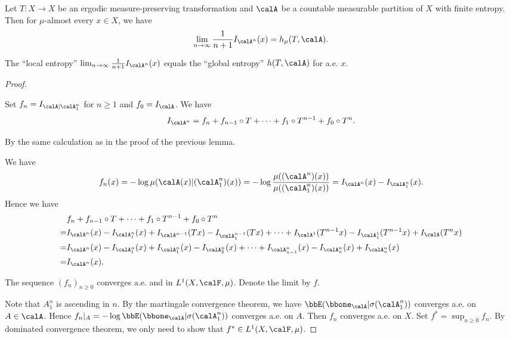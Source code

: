   \begin{theorem}
    Let $T: X \to X$ be an ergodic measure-preserving transformation and $\calA$ be a countable measurable partition of $X$ with finite entropy. 
    Then for $\mu$-almost every $x \in X$, we have
    \[
      \lim_{n \to \infty} \frac{1}{n+1} I_{\calA^n}(x) = h_\mu(T, \calA).
    \]
  \end{theorem}
  \begin{slogan}
    The ``local entropy'' $\lim_{n \to \infty} \frac{1}{n+1} I_{\calA^n}(x)$ equals the ``global entropy'' $h(T, \calA)$ for a.e. $x$.
  \end{slogan}
  \begin{proof}
    \hspace{1em}

    \begin{step}
      Set $f_n = I_{\calA | \calA^n_1}$ for $n \geq 1$ and $f_0 = I_{\calA}$.
      We have 
      \[ I_{\calA^n} = f_n + f_{n-1} \circ T + \cdots + f_1 \circ T^{n-1} + f_0 \circ T^n. \]
    \end{step}

    By the same calculation as in the proof of the previous lemma.

    We have 
    \[ f_n(x) = -\log \mu(\calA(x) | (\calA^n_1)(x)) = -\log \frac{\mu((\calA^n)(x))}{\mu((\calA^{n}_1)(x))} = I_{\calA^n}(x) - I_{\calA^n_1}(x). \]
    Hence we have 
    \begin{align*}
      & f_n + f_{n-1} \circ T + \cdots + f_1 \circ T^{n-1} + f_0 \circ T^n \\
      = & I_{\calA^n}(x) - I_{\calA^n_1}(x) + I_{\calA^{n-1}}(T x) - I_{\calA^{n-1}_1}(T x) + \cdots + I_{\calA^1}(T^{n-1} x) - I_{\calA^1_1}(T^{n-1} x) + I_{\calA}(T^n x) \\
      = & I_{\calA^n}(x) - I_{\calA^n_1}(x) + I_{\calA^{n}_1}(x) - I_{\calA^{n}_2}(x) + \cdots + I_{\calA^n_{n-1}}(x) - I_{\calA^n_n}(x) + I_{\calA^n_n}(x) \\
      = & I_{\calA^n}(x).
    \end{align*}

    \begin{step}
      The sequence $(f_n)_{n \geq 0}$ converges a.e. and in $L^1(X, \calF, \mu)$.
      Denote the limit by $f$.
    \end{step}
    Note that $A_1^n$ is ascending in $n$.
    By the martingale convergence theorem, we have $\bbE(\bbone_{\calA} | \sigma(\calA^n_1))$ converges a.e. on $A \in \calA$.
    Hence $f_n|_A = -\log \bbE(\bbone_{\calA} | \sigma(\calA^n_1))$ converges a.e. on $A$.
    Then $f_n$ converges a.e. on $X$.
    Set $f^* = \sup_{n \geq 0} f_n$.
    By dominated convergence theorem, we only need to show that $f^* \in L^1(X, \calF, \mu)$.


\end{proof}
